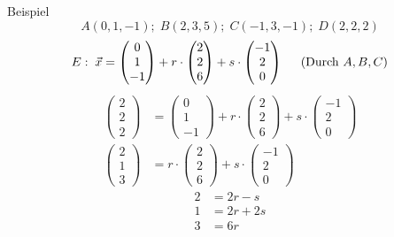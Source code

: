 \documentclass{article}
\begin{document}
\begin{boxx}[DarkBlue]{Beispiel}
    \[A(0,1,-1);\; B(2,3,5);\; C(-1,3,-1);\; D(2,2,2)\]
    \[E:\; \vec{x} = \begin{pmatrix}0\\1\\-1\end{pmatrix} + r \cdot \begin{pmatrix}2\\2\\6\end{pmatrix} + s \cdot \begin{pmatrix}-1\\2\\0\end{pmatrix}\hspace*{5mm} \text{(Durch }A,B,C\text{)}\]
    \begin{align*}
        \begin{pmatrix}2\\2\\2\end{pmatrix} &= \begin{pmatrix}0\\1\\-1\end{pmatrix} + r \cdot \begin{pmatrix}2\\2\\6\end{pmatrix} + s \cdot \begin{pmatrix}-1\\2\\0\end{pmatrix} \\
        \begin{pmatrix}2\\1\\3\end{pmatrix} &= r \cdot \begin{pmatrix}2\\2\\6\end{pmatrix} + s \cdot \begin{pmatrix}-1\\2\\0\end{pmatrix}
    \end{align*}
    \begin{align}
        2 &= 2r - s \label{ebenen3_eq1}\\
        1 &= 2r + 2s \label{ebenen3_eq2}\\
        3 &= 6r \label{ebenen3_eq3}

\end{align}
\end{boxx}
\end{document}
